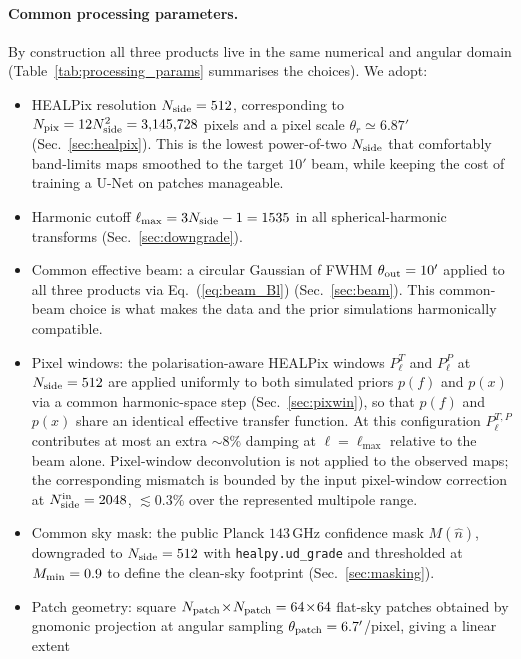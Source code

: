 \documentclass[11pt]{article}
\theoremstyle{definition}
\begin{document}
\paragraph{Common processing parameters.}
By construction all three products live in the same numerical and angular domain (Table~\ref{tab:processing_params} summarises the choices). We adopt:
\begin{itemize}[leftmargin=1.5em,itemsep=0.1em]
  \item HEALPix resolution $N_{\rm side}=512$, corresponding to $N_{\rm pix}=12N_{\rm side}^2=3{,}145{,}728$ pixels and a pixel scale $\theta_r\simeq 6.87'$ (Sec.~\ref{sec:healpix}). This is the lowest power-of-two $N_{\rm side}$ that comfortably band-limits maps smoothed to the target $10'$ beam, while keeping the cost of training a U-Net on patches manageable.
  \item Harmonic cutoff $\ell_{\max}=3N_{\rm side}-1=1535$ in all spherical-harmonic transforms (Sec.~\ref{sec:downgrade}).
  \item Common effective beam: a circular Gaussian of FWHM $\theta_{\rm out}=10'$ applied to all three products via Eq.~(\ref{eq:beam_Bl}) (Sec.~\ref{sec:beam}). This common-beam choice is what makes the data and the prior simulations harmonically compatible.
  \item Pixel windows: the polarisation-aware HEALPix windows $P_\ell^{T}$ and $P_\ell^{P}$ at $N_{\rm side}=512$ are applied uniformly to both simulated priors $p(f)$ and $p(x)$ via a common harmonic-space step (Sec.~\ref{sec:pixwin}), so that $p(f)$ and $p(x)$ share an identical effective transfer function. At this configuration $P_\ell^{T,P}$ contributes at most an extra $\sim 8\%$ damping at $\ell=\ell_{\max}$ relative to the beam alone. Pixel-window deconvolution is not applied to the observed maps; the corresponding mismatch is bounded by the input pixel-window correction at $N_{\rm side}^{\rm in}=2048$, $\lesssim 0.3\%$ over the represented multipole range.
  \item Common sky mask: the public Planck $143\,\mathrm{GHz}$ confidence mask $M(\hat n)$, downgraded to $N_{\rm side}=512$ with \texttt{healpy.ud\_grade} and thresholded at $M_{\rm min}=0.9$ to define the clean-sky footprint (Sec.~\ref{sec:masking}).
  \item Patch geometry: square $N_{\rm patch}\!\times\!N_{\rm patch}=64\!\times\!64$ flat-sky patches obtained by gnomonic projection at angular sampling $\theta_{\rm patch}=6.7'$/pixel, giving a linear extent
  \begin{equation}

\end{equation}
\end{itemize}
\end{document}
